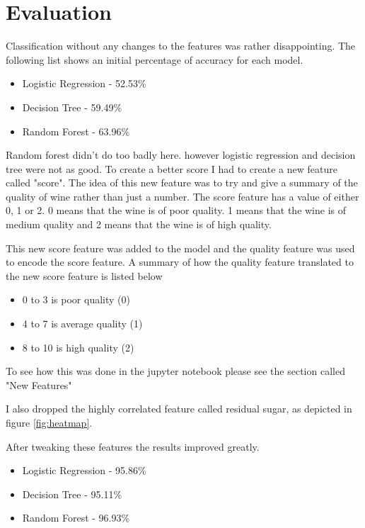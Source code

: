 \section{Evaluation}

Classification without any changes to the features was rather disappointing. The following list shows an initial percentage of accuracy for each model.

\begin{itemize}
  \item Logistic Regression - 52.53\%
  \item Decision Tree - 59.49\%
  \item Random Forest - 63.96\%
\end{itemize}

Random forest didn't do too badly here. however logistic regression and decision tree were not as good. To create a better score I had to create a new feature called "score". The idea of this new feature was to try and give a summary of the quality of wine rather than just a number. The score feature has a value of either 0, 1 or 2. 0 means that the wine is of poor quality. 1 means that the wine is of medium quality and 2 means that the wine is of high quality. 

This new score feature was added to the model and the quality feature was used to encode the score feature. A summary of how the quality feature translated to the new score feature is listed below

\begin{itemize}
  \item 0 to 3 is poor quality (0)
  \item 4 to 7 is average quality (1)
  \item 8 to 10 is high quality (2)
\end{itemize}

To see how this was done in the jupyter notebook please see the section called "New Features"

I also dropped the highly correlated feature called residual sugar, as depicted in figure \ref{fig:heatmap}. 

After tweaking these features the results improved greatly.

\begin{itemize}
  \item Logistic Regression - 95.86\%
  \item Decision Tree - 95.11\%
  \item Random Forest - 96.93\%
\end{itemize}

